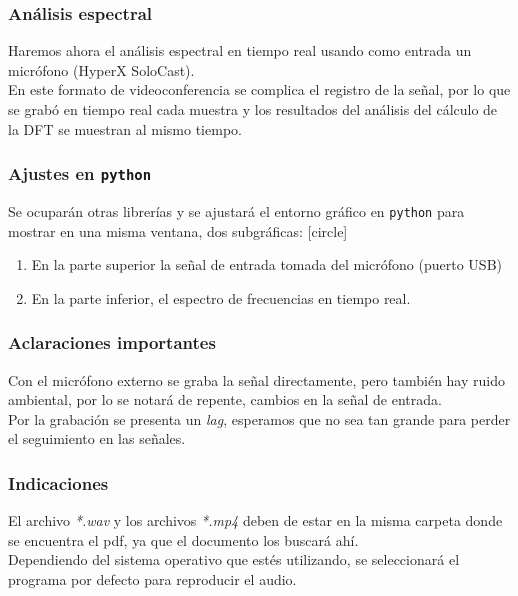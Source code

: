 \documentclass[12pt]{beamer}
\begin{document}
\begin{frame}
\frametitle{Análisis espectral}
Haremos ahora el análisis espectral en tiempo real usando como entrada un micrófono (HyperX SoloCast).
\\
\bigskip
\pause
En este formato de videoconferencia se complica el registro de la señal, por lo que se grabó en tiempo real cada muestra y los resultados del análisis del cálculo de la DFT se muestran al mismo tiempo.
\end{frame}
\begin{frame}
\frametitle{Ajustes en \texttt{python}}
Se ocuparán otras librerías y se ajustará el entorno gráfico en \texttt{python} para mostrar en una misma ventana, dos subgráficas:
[circle]
\begin{enumerate}[<+->]
\item En la parte superior la señal de entrada tomada del micrófono (puerto USB)
\item En la parte inferior, el espectro de frecuencias en tiempo real.
\end{enumerate}
\end{frame}
\begin{frame}
\frametitle{Aclaraciones importantes}
Con el micrófono externo se graba la señal directamente, pero también hay ruido ambiental, por lo se notará de repente, cambios en la señal de entrada.
\\
\bigskip
\pause
Por la grabación se presenta un \emph{lag}, esperamos que no sea tan grande para perder el seguimiento en las señales.
\end{frame}
\begin{frame}
\frametitle{Indicaciones}
El archivo \emph{*.wav} y los archivos \emph{*.mp4} deben de estar en la misma carpeta donde se encuentra el pdf, ya que el documento los buscará ahí.
\\
\bigskip
\pause
Dependiendo del sistema operativo que estés utilizando, se seleccionará el programa por defecto para reproducir el audio.
\end{frame}
\end{document}
